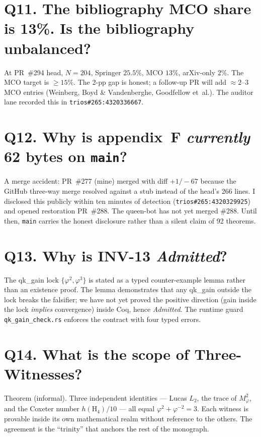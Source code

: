 \section*{Q11. The bibliography MCO share is 13\%. Is the bibliography unbalanced?}
At PR~\#294 head, $N=204$, Springer $25{.}5\%$, MCO $13\%$, arXiv-only $2\%$.
The MCO target is $\geq 15\%$. The 2-pp gap is honest; a follow-up PR will add
$\approx 2$--3 MCO entries (Weinberg, Boyd \& Vandenberghe, Goodfellow et~al.).
The auditor lane recorded this in
\texttt{trios\#265:4320336667}.

\section*{Q12. Why is appendix~F \emph{currently} 62 bytes on \texttt{main}?}
A merge accident: PR~\#277 (mine) merged with diff $+1/-67$ because the
GitHub three-way merge resolved against a stub instead of the head's 266
lines. I disclosed this publicly within ten minutes of detection
(\texttt{trios\#265:4320329925}) and opened restoration PR~\#288. The
queen-bot has not yet merged \#288. Until then, \texttt{main} carries the
honest disclosure rather than a silent claim of 92 theorems.

\section*{Q13. Why is INV-13 \emph{Admitted}?}
The qk\_gain lock $\{\varphi^{2},\varphi^{3}\}$ is stated as a typed
counter-example lemma rather than an existence proof. The lemma
 demonstrates that any
qk\_gain outside the lock breaks the falsifier; we have not yet proved the
positive direction (gain inside the lock \emph{implies} convergence) inside
Coq, hence \emph{Admitted}. The runtime guard
\texttt{qk\_gain\_check.rs} enforces the contract with four typed errors.

\section*{Q14. What is the scope of Three-Witnesses?}
Theorem (informal). Three independent identities — Lucas $L_{2}$, the trace
of $M_{\varphi}^{2}$, and the Coxeter number $h(\mathrm{H}_{4})/10$ — all
equal $\varphi^{2}+\varphi^{-2}=3$. Each witness is provable inside its own
mathematical realm without reference to the others. The agreement is the
``trinity'' that anchors the rest of the monograph.

